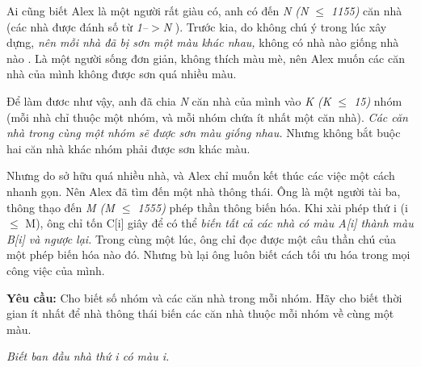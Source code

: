 Ai cũng biết Alex là một người rất giàu có, anh có đến   \emph{    N (N $\le$ 1155)   }   căn nhà (các nhà được đánh số từ   \emph{    1--$>$N   }   ). Trước kia, do không chú ý trong lúc xây dựng,   \emph{    nên mỗi nhà đã bị sơn một màu khác nhau,   }   không có nhà nào giống nhà nào . Là một người sống đơn giản, không thích màu mè, nên Alex muốn các căn nhà của mình không được sơn quá nhiều màu.  

   Để làm đươc như vậy, anh đã chia   \emph{    N   }   căn nhà của mình vào   \textbf{\emph{}}\emph{    K (K $\le$ 15)   }   nhóm (mỗi nhà chỉ thuộc một nhóm, và mỗi nhóm chứa ít nhất một căn nhà).   \emph{    Các căn nhà trong cùng một nhóm sẽ được sơn màu giống nhau.   }   Nhưng không bắt buộc hai căn nhà khác nhóm phải được sơn khác màu.   \emph{
\\}

   Nhưng do sở hữu quá nhiều nhà, và Alex chỉ muốn kết thúc các việc một cách nhanh gọn. Nên Alex đã tìm đến một nhà thông thái. Ông là một người tài ba, thông thạo đến   \emph{    M (M $\le$ 1555)   }   phép thần thông biến hóa. Khi xài phép thứ i (i $\le$ M), ông chỉ tốn C[i] giây để có thể   \emph{    biến tất cả các nhà có màu A[i] thành màu B[i] và ngược lại.   }   Trong cùng một lúc, ông chỉ đọc được một câu thần chú của một phép biến hóa nào đó.   \emph{}   Nhưng bù lại ông luôn biết cách tối ưu hóa trong mọi công việc của mình.   \emph{
\\}

\textbf{    Yêu cầu:   }   Cho biết số nhóm và các căn nhà trong mỗi nhóm. Hãy cho biết thời gian ít nhất để nhà thông thái biến các căn nhà thuộc mỗi nhóm về cùng một màu.  

\emph{    Biết ban đầu nhà thứ i có màu i.    
\\}